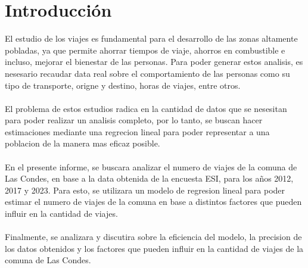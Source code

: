 \documentclass[12pt]{article} %
\begin{document}

\setcounter{page}{1} %

\section{Introducción}

El estudio de los viajes es fundamental para el desarrollo de las zonas altamente pobladas, ya que permite ahorrar tiempos de viaje, ahorros en combustible e incluso, mejorar el bienestar de las personas. Para poder generar estos analisis, es nesesario recaudar data real sobre el comportamiento de las personas como su tipo de transporte, origne y destino, horas de viajes, entre otros.
\\ \\
El problema de estos estudios radica en la cantidad de datos que se nesesitan para poder realizar un analisis completo, por lo tanto, se buscan hacer estimaciones mediante una regrecion lineal para poder representar a una poblacion de la manera mas eficaz posible.
\\ \\
En el presente informe, se buscara analizar el numero de viajes de la comuna de Las Condes, en base a la data obtenida de la encuesta ESI, para los años 2012, 2017 y 2023. Para esto, se utilizara un modelo de regresion lineal para poder estimar el numero de viajes de la comuna en base a distintos factores que pueden influir en la cantidad de viajes.
\\ \\
Finalmente, se analizara y discutira sobre la eficiencia del modelo, la precision de los datos obtenidos y los factores que pueden influir en la cantidad de viajes de la comuna de Las Condes.
\end{document}
